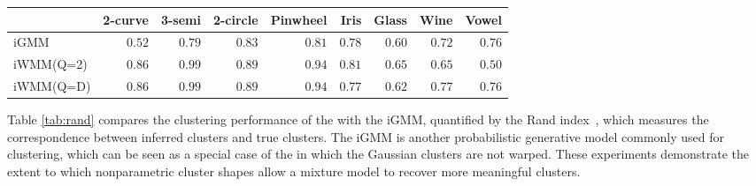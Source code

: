 \begin{table*}[ht!]
\centering
\caption[Clustering performance comparison]
{Average Rand index for evaluating clustering performance.}
\label{tab:rand}
\begin{tabular}{lrrrrrrrr}
\hline
 & 2-curve & 3-semi & 2-circle & Pinwheel & Iris  & Glass  & Wine  & Vowel  \\
\hline
iGMM & $0.52$ & $0.79$ & $0.83$ & $0.81$ & $0.78$ & $0.60$ & $0.72$ & $\mathbf{0.76}$ \\
iWMM(Q=2) & $\mathbf{0.86}$ & $\mathbf{0.99}$ & $\mathbf{0.89}$ & $\mathbf{0.94}$ & $\mathbf{0.81}$ & $\mathbf{0.65}$ & $0.65$ & $0.50$ \\
iWMM(Q=D) & $\mathbf{0.86}$ & $\mathbf{0.99}$ & $\mathbf{0.89}$ & $\mathbf{0.94}$ & $0.77$ & $0.62$ & $\mathbf{0.77}$ & $\mathbf{0.76}$ \\
\hline
\end{tabular}
\end{table*}
%
Table \ref{tab:rand} compares the clustering performance of the \iwmm{} with the iGMM, quantified by the Rand index~\cite{rand1971objective}, which measures the correspondence between inferred clusters and true clusters.
The iGMM is another probabilistic generative model commonly used for clustering, which can be seen as a special case of the \iwmm{} in which the Gaussian clusters are not warped.  
These experiments demonstrate the extent to which nonparametric cluster shapes allow a mixture model to recover more meaningful clusters.


